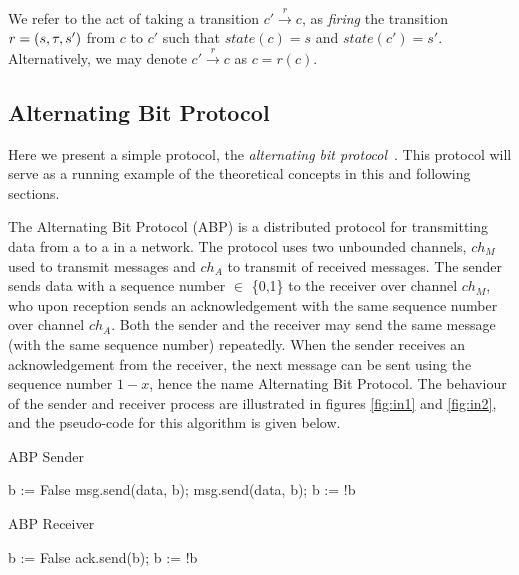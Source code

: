 We refer to the act of taking a transition $c' \xrightarrow{r} c$, as \emph{firing} the transition $r=(s,\tau,s')$ from $c$ to $c'$ such that $state(c)=s$ and $state(c')=s'$. Alternatively, we may denote $c' \xrightarrow{r} c$ as $c = r(c)$.

\subsection{Alternating Bit Protocol}
Here we present a simple protocol, the \emph{alternating bit protocol}~\cite{bartlett1969note}. This protocol will serve as a running example of the theoretical concepts in this and following sections.

The Alternating Bit Protocol (ABP)\cite{foldoc} is a distributed protocol for transmitting data from a  to a  in a network. The protocol uses two unbounded channels, $ch_M$ used to transmit messages and $ch_A$ to transmit  of received messages. The sender sends data with a sequence number  $\in$ \{0,1\} to the receiver over channel $ch_M$, who upon reception sends an acknowledgement with the same sequence number over channel $ch_A$. Both the sender and the receiver may send the same message (with the same sequence number) repeatedly. When the sender receives an acknowledgement from the receiver, the next message can be sent using the sequence number $1-x$, hence the name Alternating Bit Protocol. The behaviour of the sender and receiver process are illustrated in figures \ref{fig:in1} and \ref{fig:in2}, and the pseudo-code for this algorithm is given below.

\begin{algorithm}
  \caption{ABP Sender}
  \label{senderpseudo}
\begin{algorithmic}[1]
    \State b := False 
      \State msg.send(data, b); 
       
      \State msg.send(data, b); 
      \EndWhile
      \State b := !b 
    \EndFor
\end{algorithmic}
\end{algorithm}


\begin{algorithm}
  \caption{ABP Receiver}
  \label{senderpseudo}
\begin{algorithmic}[1]
    \State b := False 
       
      \State ack.send(b); 
      \EndWhile
      \State b := !b 
    \EndFor
\end{algorithmic}
\end{algorithm}

